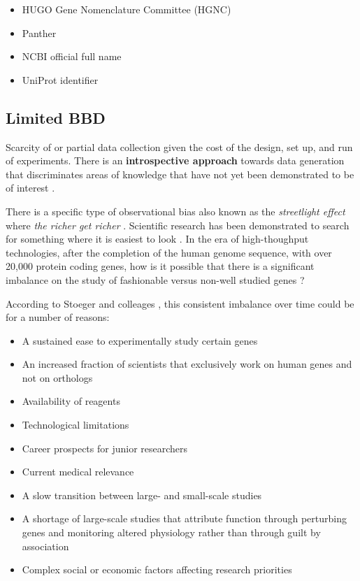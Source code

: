 \begin{itemize}
    \item HUGO Gene Nomenclature Committee (HGNC)
    \item Panther
    \item NCBI official full name
    \item UniProt identifier
\end{itemize}

\subsection{Limited BBD}
Scarcity of or partial data collection given the cost of the design, set up, and run of experiments. There is an \textbf{introspective approach} towards data generation that discriminates areas of knowledge that have not yet been demonstrated to be of interest \cite{brown2018}.

There is a specific type of observational bias also known as the \emph{streetlight effect} \cite{dunham2019} where \emph{the richer get richer} \cite{stoeger2018}. Scientific research has been demonstrated to search for something where it is easiest to look \cite{stoeger2018}. In the era of high-thoughput technologies, after the completion of the human genome sequence, with over 20,000 protein coding genes, how is it possible that there is a significant imbalance on the study of fashionable versus non-well studied genes \cite{stoeger2018}?

According to Stoeger and colleages \cite{stoeger2018}, this consistent imbalance over time could be for a number of reasons:
\begin{itemize}
    \item A sustained ease to experimentally study certain genes
    \item An increased fraction of scientists that exclusively work on human genes and not on orthologs
    \item Availability of reagents
    \item Technological limitations
    \item Career prospects for junior researchers
    \item Current medical relevance
    \item A slow transition between large- and small-scale studies
    \item A shortage of large-scale studies that attribute function through perturbing genes and monitoring altered physiology rather than through guilt by association
    \item Complex social or economic factors affecting research priorities
\end{itemize}

